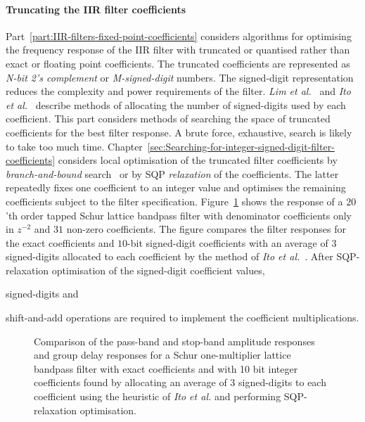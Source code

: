 \documentclass[a4paper,twoside,10pt,english]{report}
\begin{document}
\paragraph{Truncating the IIR filter coefficients}
Part~\ref{part:IIR-filters-fixed-point-coefficients} considers algorithms for
optimising the frequency response of the IIR filter with truncated or
quantised rather than exact or floating point coefficients. The truncated
coefficients are represented as \emph{N-bit 2's complement} or
\emph{M-signed-digit} numbers. The signed-digit representation reduces the
complexity and power requirements of the filter. \emph{Lim et
  al.}~\cite{Lim_SignedPowerOfTwoAllocationDigitalFilters} and \emph{Ito et
  al.}~\cite{Ito_PowersOfTwoAllocationFIR} describe methods of allocating the
number of signed-digits used by each coefficient. This part considers methods
of searching the space of truncated coefficients for the best filter
response. A brute force, exhaustive, search is likely to take too much
time. Chapter~\ref{sec:Searching-for-integer-signed-digit-filter-coefficients}
considers local optimisation of the truncated filter coefficients by
\emph{branch-and-bound}
search~\cite{LandDoig_AutomaticMethodSolvingDiscreteProgrammingProblems} or by
SQP \emph{relaxation} of the coefficients. The latter repeatedly fixes one
coefficient to an integer value and optimises the remaining coefficients
subject to the filter specification.
Figure~\ref{fig:sqp-relax-schurOneMlattice-bandpass-10-nbits-intro-response}
shows the response of a $20$'th order tapped Schur lattice bandpass filter
with denominator coefficients only in $z^{-2}$ and $31$ non-zero
coefficients. The figure compares the filter responses for the exact
coefficients and $10$-bit signed-digit coefficients with an average of $3$
signed-digits allocated to each coefficient by the method of \emph{Ito et
  al.}~\cite{Ito_PowersOfTwoAllocationFIR}. After SQP-relaxation optimisation
of the signed-digit coefficient values, 

signed-digits and

shift-and-add operations are required to implement the coefficient
multiplications.
\begin{figure}[!htbp]
\begin{center}
\scalebox{0.7}{}
\caption{Comparison of the pass-band and stop-band amplitude responses and
  group delay responses for a Schur one-multiplier lattice bandpass filter
  with exact coefficients and with 10 bit integer coefficients found by
  allocating an average of 3 signed-digits to each coefficient using the
  heuristic of \emph{Ito et al.} and performing SQP-relaxation optimisation.}
\label{fig:sqp-relax-schurOneMlattice-bandpass-10-nbits-intro-response}
\end{center}
\end{figure}
\end{document}
